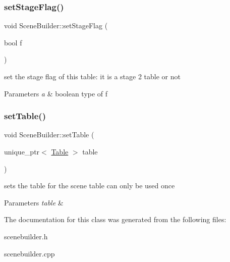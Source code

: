 \subsubsection{\texorpdfstring{set\+Stage\+Flag()}{setStageFlag()}}
{\footnotesize\ttfamily void Scene\+Builder\+::set\+Stage\+Flag (\begin{DoxyParamCaption}\item[{bool}]{f }\end{DoxyParamCaption})}



set the stage flag of this table\+: it is a stage 2 table or not 


\begin{DoxyParams}{Parameters}
{\em a} & boolean type of f \\
\hline
\end{DoxyParams}
\mbox{\label{class_scene_builder_a882fc4e2eff2017ec95503883a2af866}} 
\subsubsection{\texorpdfstring{set\+Table()}{setTable()}}
{\footnotesize\ttfamily void Scene\+Builder\+::set\+Table (\begin{DoxyParamCaption}\item[{unique\+\_\+ptr$<$ \mbox{\hyperlink{class_table}{Table}} $>$}]{table }\end{DoxyParamCaption})}



sets the table for the scene table can only be used once 


\begin{DoxyParams}{Parameters}
{\em table} & \\
\hline
\end{DoxyParams}


The documentation for this class was generated from the following files\+:\begin{DoxyCompactItemize}
\item 
scenebuilder.\+h\item 
scenebuilder.\+cpp\end{DoxyCompactItemize}
